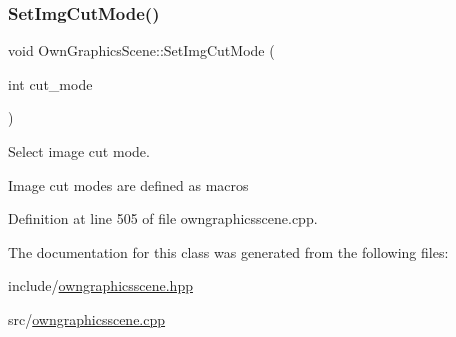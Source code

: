 \mbox{\label{classOwnGraphicsScene_a656919c9fdd0827ae182d3d3f5f91e4f}} 
\subsubsection{\texorpdfstring{Set\+Img\+Cut\+Mode()}{SetImgCutMode()}}
{\footnotesize\ttfamily void Own\+Graphics\+Scene\+::\+Set\+Img\+Cut\+Mode (\begin{DoxyParamCaption}\item[{int}]{cut\+\_\+mode }\end{DoxyParamCaption})}



Select image cut mode. 

Image cut modes are defined as macros 

Definition at line 505 of file owngraphicsscene.\+cpp.



The documentation for this class was generated from the following files\+:\begin{DoxyCompactItemize}
\item 
include/\mbox{\hyperlink{owngraphicsscene_8hpp}{owngraphicsscene.\+hpp}}\item 
src/\mbox{\hyperlink{owngraphicsscene_8cpp}{owngraphicsscene.\+cpp}}\end{DoxyCompactItemize}
